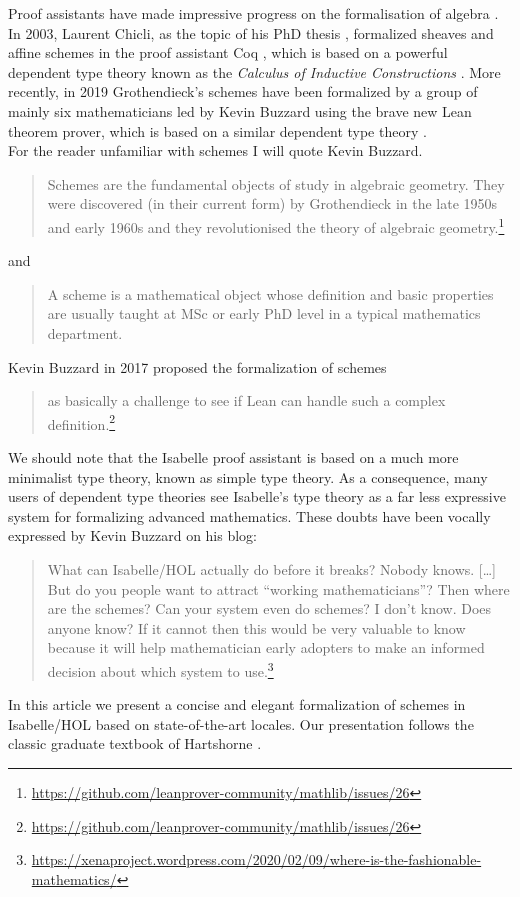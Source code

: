 \documentclass[12pt]{scrartcl}
\begin{document}
Proof assistants have made impressive progress on the formalisation of algebra \cite{oddorderthm}. In 2003, Laurent Chicli, as the topic of his PhD thesis \cite{chiclithesis}, formalized sheaves and affine schemes in the proof assistant Coq \cite{coqrefmanual}, which is based on a powerful dependent type theory known as the \emph{Calculus of Inductive Constructions} \cite{coquand1986calculus, coquand1988inductively}. More recently, in 2019 Grothendieck's schemes \cite{GrothendieckEGAI} have been formalized by a group of mainly six mathematicians led by Kevin Buzzard \cite{schemesinLean} using the brave new Lean theorem prover, which is based on a similar dependent type theory \cite{de2015lean}. \\
For the reader unfamiliar with schemes I will quote Kevin Buzzard.
\begin{quote}
	Schemes are the fundamental objects of study in algebraic geometry. They were discovered (in their current form) by Grothendieck in the late 1950s and early 1960s and they revolutionised the theory of algebraic geometry.\footnote{\url{https://github.com/leanprover-community/mathlib/issues/26}} 
\end{quote}
and
\begin{quote}
	A scheme is a mathematical object whose definition and basic properties are usually taught at MSc or early PhD level in a typical mathematics department.
\end{quote}	
Kevin Buzzard in 2017 proposed the formalization of schemes 
\begin{quote}
	as basically a challenge to see if Lean can handle such a complex definition.\footnote{\url{https://github.com/leanprover-community/mathlib/issues/26}} 
\end{quote}
We should note that the Isabelle proof assistant is based on a much more minimalist type theory, known as simple type theory. As a consequence, many users of dependent type theories see Isabelle's type theory as a far less expressive system for formalizing advanced mathematics.  These doubts have been vocally expressed by Kevin Buzzard on his blog:
\begin{quote}
	What can Isabelle/HOL actually do before it breaks? Nobody knows. [\dots] But do you people want to attract “working mathematicians”? Then where are the schemes? Can your system even do schemes? I don’t know. Does anyone know? If it cannot then this would be very valuable to know because it will help mathematician early adopters to make an informed decision about which system to use.\footnote{\url{https://xenaproject.wordpress.com/2020/02/09/where-is-the-fashionable-mathematics/}}
\end{quote}
In this article we present a concise and elegant formalization of schemes in Isabelle/HOL based on state-of-the-art locales. Our presentation follows the classic graduate textbook of Hartshorne \cite{hartshorne}. 			
\end{document}
